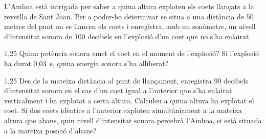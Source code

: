 L'Ainhoa està intrigada per saber a quina altura exploten els coets llançats a la revetlla de Sant Joan. Per a poder-ho determinar se situa a una distància de 50 metres del punt on es llancen els coets i enregistra, amb un sonòmetre, un nivell d'intensitat sonora de 100 decibels en l'explosió d'un coet que no s'ha enlairat.

\begin{apartat}{1,25}
Quina potència sonora emet el coet en el moment de l'explosió? Si l'explosió ha durat 0,03~s, quina energia sonora s'ha alliberat?
\end{apartat}

\begin{apartat}{1,25}
Des de la mateixa distància al punt de llançament, enregistra 90 decibels d'intensitat sonora en el cas d'un coet igual a l'anterior que s'ha enlairat verticalment i ha explotat a certa altura. Calculeu a quina altura ha explotat el coet. Si dos coets idèntics a l'anterior exploten simultàniament a la mateixa altura que abans, quin nivell d'intensitat sonora percebrà l'Ainhoa, si està situada a la mateixa posició d'abans?
\end{apartat}

